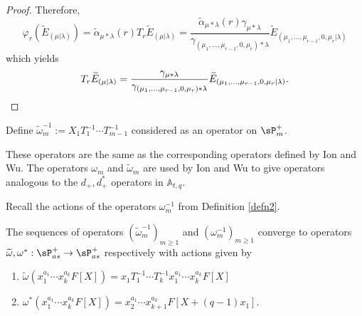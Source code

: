 \begin{proof}
Therefore, 
$$\varphi_{r}(\widetilde{E}_{(\mu|\lambda)}) = \widetilde{\alpha}_{\mu*\lambda}(r) T_r \widetilde{E}_{(\mu|\lambda)} = \frac{\widetilde{\alpha}_{\mu*\lambda}(r)\gamma_{\mu*\lambda}}{\gamma_{(\mu_1,\ldots,\mu_{r-1},0,\mu_r)*\lambda}} \widetilde{E}_{(\mu_1,\ldots,\mu_{r-1},0,\mu_r|\lambda)}$$ which yields 
$$T_r\widetilde{E}_{(\mu|\lambda)} = \frac{\gamma_{\mu*\lambda}}{\gamma_{(\mu_1,\ldots,\mu_{r-1},0,\mu_r)*\lambda}} \widetilde{E}_{(\mu_1,\ldots,\mu_{r-1},0,\mu_r|\lambda)}. \qedhere$$
\end{proof}

\begin{defi}\label{defn 10}
 Define $\widetilde{\omega}_m^{-1} := X_1T_1^{-1}\cdots T_{m-1}^{-1}$ considered as an operator on $\sP_{m}^{+}$.
\end{defi}

\begin{rema}
    These operators are the same as the corresponding operators defined by Ion and Wu. The operators $\omega_m$ and $\widetilde{\omega}_m$ are used by Ion and Wu \cite{Ion_2022} to give operators analogous to the $d_{+},d_{+}^{*}$ operators in $\mathbb{A}_{t,q}$.
\end{rema}

Recall the actions of the operators $\omega_{m}^{-1}$ from Definition \ref{defn2}.

\begin{lemm}\label{pis converges}
    The sequences of operators $(\widetilde{\omega}_m^{-1})_{m\geq 1}$ and $(\omega_{m}^{-1})_{m \geq 1}$ converge to operators $\widetilde{\omega}, \omega^{*}: \sP_{as}^{+} \rightarrow \sP_{as}^{+}$ respectively with actions given by 
    \begin{enumerate}
        \item $\widetilde{\omega}(x_1^{a_1}\cdots x_k^{a_k}F[X]) = x_1T_1^{-1}\cdots T_{k}^{-1}x_1^{a_1}\cdots x_k^{a_k}F[X]$ \label{tilde omega action}
        \item $\omega^{*}(x_1^{a_1}\cdots x_k^{a_k}F[X]) = x_2^{a_1}\cdots x_{k+1}^{a_k}F[X+(q-1)x_1].$
    \end{enumerate}

    
\end{lemm}

